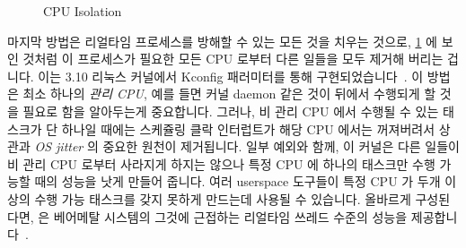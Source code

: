 \fi

\begin{figure}[tb]
\centering
{}
\caption{CPU Isolation}
\label{fig:advsync:CPU Isolation}
\end{figure}

마지막 방법은 리얼타임 프로세스를 방해할 수 있는 모든 것을 치우는 것으로,
\cref{fig:advsync:CPU Isolation} 에 보인 것처럼 이 프로세스가 필요한 모든 CPU
로부터 다른 일들을 모두 제거해 버리는 겁니다.
이는 3.10 리눅스 커널에서  Kconfig 패러미터를 통해
구현되었습니다~\cite{JonCorbet2013NO-HZ-FULL,FredericWeisbecker2013nohz}.
이 방법은 최소 하나의 \emph{관리 CPU}, 예를 들면 커널 daemon 같은 것이 뒤에서
수행되게 할 것을 필요로 함을 알아두는게 중요합니다.
그러나, 비 관리 CPU 에서 수행될 수 있는 태스크가 단 하나일 때에는 스케쥴링 클락
인터럽트가 해당 CPU 에서는 꺼져버려서 상관과 \emph{OS jitter} 의 중요한 원천이
제거됩니다.
일부 예외와 함께, 이 커널은 다른 일들이 비 관리 CPU 로부터 사라지게 하지는
않으나 특정 CPU 에 하나의 태스크만 수행 가능할 때의 성능을 낫게 만들어 줍니다.
여러 userspace 도구들이 특정 CPU 가 두개 이상의 수행 가능 태스크를 갖지 못하게
만드는데 사용될 수 있습니다.
올바르게 구성된다면,  은 베어메탈 시스템의 그것에
근접하는 리얼타임 쓰레드 수준의 성능을
제공합니다~\cite{AbdullahAljuhni2018nohzfull}.

\iffalse

